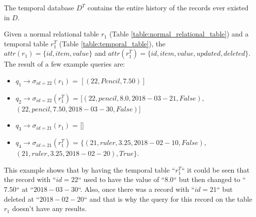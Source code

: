 		The temporal database $D^T$ contains the entire history of the records ever existed in $D$.

		\begin{example}
			Given a normal relational table $r_1$ (Table \ref{table:normal_relational_table}) and a temporal table $r_1^T$ (Table \ref{table:temporal_table}), the $attr(r_1) = \{id, item, value\}$ and $attr(r_1^T)= \{id, item, value, updated, deleted\}$. The result of a few example queries are:

			\begin{itemize}
				\item \textbf{$q_1 \to \sigma_{id = 22}(r_1)$} = $[(22,Pencil,7.50)]$
				\item \textbf{$q_2 \to \sigma_{id = 22}(r_1^T)$} = $[(22,pencil,8.0,2018-03-21,False),$ \\ $(22,pencil,7.50,2018-03-30,False)]$
				\item \textbf{$q_3 \to \sigma_{id = 21}(r_1)$} = []
				\item \textbf {$q_4 \to \sigma_{id = 21}(r_1^T)$} = $\{(21,ruler,3.25,2018-02-10,False),$ \\ $(21,ruler,3.25,2018-02-20), True\}$.
			\end{itemize}
			This example shows that by having the temporal table ``$r_1^T$`` it could be seen that the record with ``$id = 22$`` used to have the value of ``$8.0$`` but then changed to ``$7.50$`` at ``$2018-03-30$``. Also, once there was a record with ``$id = 21$`` but deleted at ``$2018-02-20$`` and that is why the query for this record on the table $r_1$ doesn't have any results.
		\label{example:temporal_table}
		\end{example}

